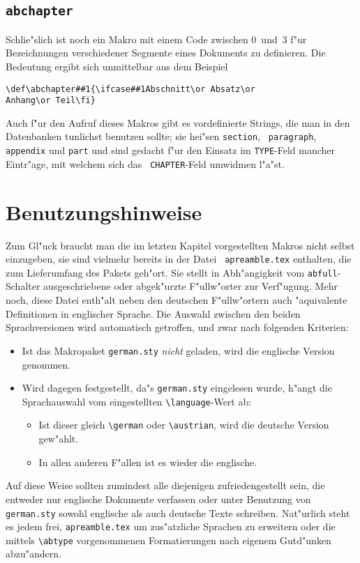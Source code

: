 \subsection*{{\tt abchapter}}

Schlie"slich ist noch ein Makro mit einem Code zwischen 0~und~3 f"ur
Bezeichnungen verschiedener Segmente eines Dokuments zu definieren. Die
Bedeutung ergibt sich unmittelbar aus dem Beispiel
\begin{verbatim}
\def\abchapter##1{\ifcase##1Abschnitt\or Absatz\or
Anhang\or Teil\fi}
\end{verbatim}
Auch f"ur den Aufruf dieses Makros gibt es vordefinierte Strings, die man in
den Datenbanken tunlichst benutzen sollte; sie hei"sen {\tt section}, {\tt
paragraph}, {\tt appendix} und {\tt part} und sind gedacht f"ur den Einsatz
im {\tt TYPE}-Feld mancher Eintr"age, mit welchem sich das {\tt
CHAPTER}-Feld umwidmen l"a"st.

\section*{Benutzungshinweise} %

Zum Gl"uck braucht man die im letzten Kapitel vorgestellten Makros nicht
selbst einzugeben, sie sind vielmehr bereits in der Datei {\tt
apreamble.tex} enthalten, die zum Lieferumfang des Pakets geh"ort. Sie
stellt in Abh"angigkeit vom \verb|abfull|-Schalter ausgeschriebene oder
abgek"urzte F"ullw"orter zur Verf"ugung.  Mehr noch, diese Datei enth"alt
neben den deutschen F"ullw"ortern auch "aquivalente Definitionen in
englischer Sprache. Die Auswahl zwischen den beiden Sprachversionen wird
automatisch getroffen, und zwar nach folgenden Kriterien:
\begin{itemize}
  \item Ist das Makropaket {\tt german.sty} {\em nicht\/} geladen, wird die
englische Version genommen.
  \item Wird dagegen festgestellt, da"s {\tt german.sty} eingelesen wurde,
h"angt die Sprachauswahl vom eingestellten \verb|\language|-Wert ab:
  \begin{itemize}
    \item Ist dieser gleich \verb|\german| oder \verb|\austrian|, wird die
  deutsche Version gew"ahlt.
    \item In allen anderen F"allen ist es wieder die englische.
  \end{itemize}
\end{itemize}
Auf diese Weise sollten zumindest alle diejenigen zufriedengestellt sein,
die entweder nur englische Dokumente verfassen oder unter Benutzung von {\tt
german.sty} sowohl englische als auch deutsche Texte schreiben. Nat"urlich
steht es jedem frei, {\tt apreamble.tex} um zus"atzliche Sprachen zu
erweitern oder die mittels \verb|\abtype| vorgenommenen Formatierungen nach
eigenem Gutd"unken abzu"andern.

